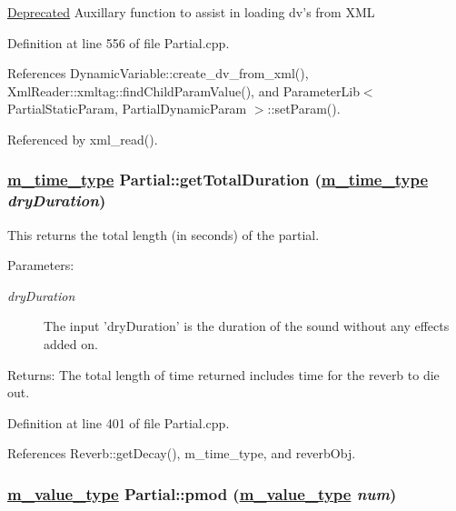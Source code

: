 \begin{Desc}
\item[\hyperlink{deprecated__deprecated000026}{Deprecated}]Auxillary function to assist in loading dv's from XML \end{Desc}


Definition at line 556 of file Partial.cpp.

References Dynamic\-Variable::create\_\-dv\_\-from\_\-xml(), Xml\-Reader::xmltag::find\-Child\-Param\-Value(), and Parameter\-Lib$<$ Partial\-Static\-Param, Partial\-Dynamic\-Param $>$::set\-Param().

Referenced by xml\_\-read().\hypertarget{classPartial_a5}{
\subsubsection[getTotalDuration]{\setlength{\rightskip}{0pt plus 5cm}\hyperlink{Types_8h_a2}{m\_\-time\_\-type} Partial::get\-Total\-Duration (\hyperlink{Types_8h_a2}{m\_\-time\_\-type} {\em dry\-Duration})}}
\label{classPartial_a5}


This returns the total length (in seconds) of the partial. \begin{Desc}
\item[Parameters:]
\begin{description}
\item[{\em dry\-Duration}]The input 'dry\-Duration' is the duration of the sound without any effects added on. \end{description}
\end{Desc}
\begin{Desc}
\item[Returns:]The total length of time returned includes time for the reverb to die out. \end{Desc}


Definition at line 401 of file Partial.cpp.

References Reverb::get\-Decay(), m\_\-time\_\-type, and reverb\-Obj.\hypertarget{classPartial_d1}{
\subsubsection[pmod]{\setlength{\rightskip}{0pt plus 5cm}\hyperlink{Types_8h_a3}{m\_\-value\_\-type} Partial::pmod (\hyperlink{Types_8h_a3}{m\_\-value\_\-type} {\em num})}}
\label{classPartial_d1}



